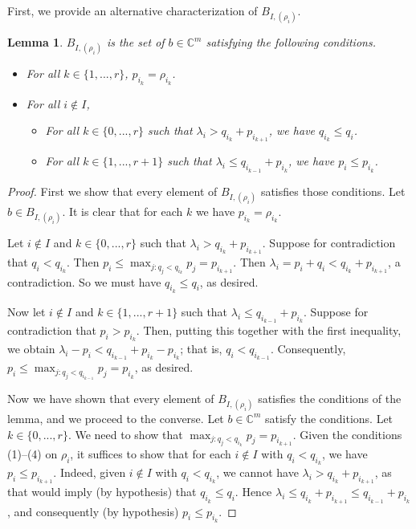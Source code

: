\documentclass[12pt,psamsfonts]{article}
\newtheorem{lemma}[theorem]{Lemma}
\begin{document}
\par First, we provide an alternative characterization of \(B_{I, (\rho_i)}\).
\begin{lemma}\label{alternative_bs_one}
    \(B_{I, (\rho_i)}\) is the set of \(b \in \mathbb{C}^m\) satisfying the following conditions.
    \begin{itemize}
        \item For all \(k \in \{1, ..., r\}\), \(p_{i_k} = \rho_{i_k}\).
        \item For all \(i \notin I\),
        \begin{itemize}
            \item For all \(k \in \{0, ..., r\}\) such that \(\lambda_i > q_{i_k} + p_{i_{k + 1}}\), we have \(q_{i_k} \leq q_i\).
            \item For all \(k \in \{1, ..., r + 1\}\) such that \(\lambda_i \leq q_{i_{k - 1}} + p_{i_k}\), we have \(p_i \leq p_{i_k}\).
        \end{itemize}
    \end{itemize}
\end{lemma}
\begin{proof}
    First we show that every element of \(B_{I, (\rho_i)}\) satisfies those conditions.
    Let \(b \in B_{I, (\rho_i)}\).
    It is clear that for each \(k\) we have \(p_{i_k} = \rho_{i_k}\).
    \par Let \(i \notin I\) and \(k \in \{0, ..., r\}\) such that \(\lambda_i > q_{i_k} + p_{i_{k + 1}}\).
    Suppose for contradiction that \(q_i < q_{i_k}\).
    Then \(p_i \leq \max_{j : q_j < q_{i_k}} p_j = p_{i_{k + 1}}\).
    Then \(\lambda_i = p_i + q_i < q_{i_k} + p_{i_{k + 1}}\), a contradiction.
    So we must have \(q_{i_k} \leq q_i\), as desired.
    \par Now let \(i \notin I\) and \(k \in \{1, ..., r + 1\}\) such that \(\lambda_i \leq q_{i_{k - 1}} + p_{i_k}\).
    Suppose for contradiction that \(p_i > p_{i_k}\).
    Then, putting this together with the first inequality, we obtain \(\lambda_i - p_i < q_{i_{k - 1}} + p_{i_k} - p_{i_k}\); that is, \(q_i < q_{i_{k - 1}}\).
    Consequently, \(p_i \leq \max_{j : q_j < q_{i_{k - 1}}} p_j = p_{i_k}\), as desired.
    \par Now we have shown that every element of \(B_{I, (\rho_i)}\) satisfies the conditions of the lemma, and we proceed to the converse.
    Let \(b \in \mathbb{C}^m\) satisfy the conditions.
    Let \(k \in \{0, ..., r\}\).
    We need to show that \(\max_{j : q_j < q_{i_k}} p_j = p_{i_{k + 1}}\).
    Given the conditions (1)--(4) on \(\rho_i\), it suffices to show that for each \(i \notin I\) with \(q_i < q_{i_k}\), we have \(p_i \leq p_{i_{k + 1}}\).
    Indeed, given \(i \notin I\) with \(q_i < q_{i_k}\), we cannot have \(\lambda_i > q_{i_k} + p_{i_{k + 1}}\), as that would imply (by hypothesis) that \(q_{i_k} \leq q_i\).
    Hence \(\lambda_i \leq q_{i_k} + p_{i_{k + 1}} \leq q_{i_{k - 1}} + p_{i_k}\), and consequently (by hypothesis) \(p_i \leq p_{i_k}\).
\end{proof}
\end{document}
